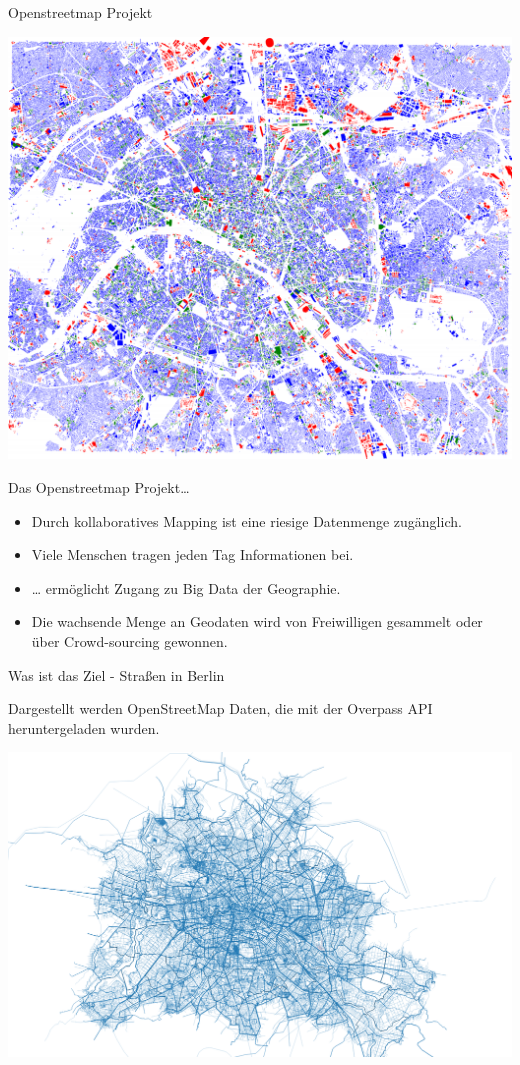 \documentclass[ignorenonframetext,]{beamer}
\providecommand{\tightlist}{%
  \setlength{\itemsep}{0pt}\setlength{\parskip}{0pt}}
\begin{document}
\begin{frame}{Openstreetmap Projekt}

\includegraphics{figure/Buldings_Paris.PNG}

\end{frame}

\begin{frame}{Das Openstreetmap Projekt\ldots{}}

\begin{itemize}
\tightlist
\item
  Durch kollaboratives Mapping ist eine riesige Datenmenge zugänglich.
\item
  Viele Menschen tragen jeden Tag Informationen bei.
\item
  \ldots{} ermöglicht Zugang zu Big Data der Geographie.
\item
  Die wachsende Menge an Geodaten wird von Freiwilligen gesammelt oder
  über Crowd-sourcing gewonnen.
\end{itemize}

\end{frame}

\begin{frame}{Was ist das Ziel - Straßen in Berlin}

Dargestellt werden OpenStreetMap Daten, die mit der Overpass API
heruntergeladen wurden.

\includegraphics{figure/streets_Berlin2.png}

\end{frame}
\end{document}
